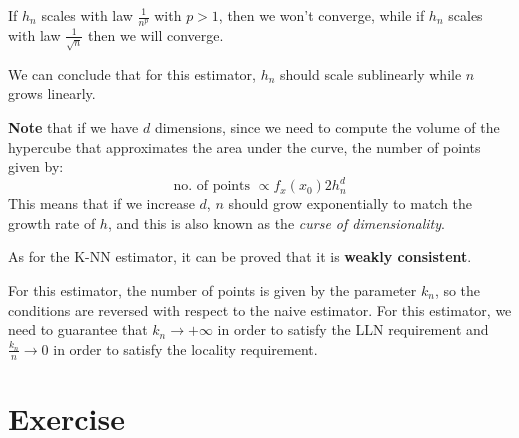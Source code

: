 If $h_n$ scales with law $\frac{1}{n^p}$ with $p>1$, then we won't converge, while if $h_n$ scales with law $\frac{1}{\sqrt{n}}$ then we will converge.

We can conclude that for this estimator, $h_n$ should scale sublinearly while $n$ grows linearly.

\textbf{Note} that if we have $d$ dimensions, since we need to compute the volume of the hypercube that approximates the area under the curve, the number of points given by:
\[
    \text{no. of points } \propto f_x(x_0) 2 h^d_n
\]
This means that if we increase $d$, $n$ should grow exponentially to match the growth rate of $h$, and this is also known as the \textit{curse of dimensionality}.

As for the K-NN estimator, it can be proved that it is \textbf{weakly consistent}.

For this estimator, the number of points is given by the parameter $k_n$, so the conditions are reversed with respect to the naive estimator. For this estimator, we need to guarantee that $k_n \to +\infty$ in order to satisfy the LLN requirement and $\frac{k_n}{n} \to 0$ in order to satisfy the locality requirement.

\section{Exercise}

